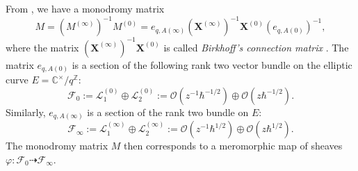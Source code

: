 \documentclass[a4paper]{report}
\theoremstyle{theorem}
\theoremstyle{definition}
\theoremstyle{remark}
\theoremstyle{proposition}
\theoremstyle{conjecture}
\theoremstyle{lemma}
\theoremstyle{corollary}
\theoremstyle{exercise}
\theoremstyle{example}
\newcommand{\C}{\mathbb{C}}
\newcommand{\mcal}{\mathcal}
\begin{document}
  From \cite{sauloy03}, we have a monodromy matrix 
  \begin{equation}\label{eqn_sauloy_monodromy_mat}
      M = \left( M^{(\infty)}\right)^{-1} M^{(0)} = e_{q,A(\infty)}\left(\mathbf{X}^{(\infty)}\right)^{-1}\mathbf{X}^{(0)} \left(e_{q,A(0)}\right)^{-1},
  \end{equation}
  where the matrix $\left(\mathbf{X}^{(\infty)}\right)^{-1}\mathbf{X}^{(0)}$ is called \emph{Birkhoff's connection matrix} 
  \cite[\S 1.2.3]{sauloy03}. The matrix $e_{q,A(0)}$ is a section of the following
  rank two vector bundle on the elliptic curve $E = \C^\times/q^{\mathbb{Z}}$:
  $$\mcal{F}_0 := \mcal{L}_1^{(0)} \oplus \mcal{L}_2^{(0)} := \mcal{O}(z^{-1}\hbar^{-1/2})\oplus \mcal{O}(z\hbar^{-1/2}).$$
  Similarly, $e_{q,A(\infty)}$ is a section of the rank two bundle on $E$:
  $$\mcal{F}_\infty := \mcal{L}_1^{(\infty)}\oplus \mcal{L}_2^{(\infty)} := \mcal{O}(z^{-1}\hbar^{1/2}) \oplus \mcal{O}(z\hbar^{1/2}).$$
  The monodromy matrix $M$ then corresponds to a meromorphic map of sheaves $\varphi : \mcal{F}_0 \dashrightarrow \mcal{F}_\infty$.
\end{document}
